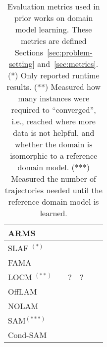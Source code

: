 \documentclass{article}
\newcommand{\cmark}{\ding{51}} %
\newcommand{\xmark}{\ding{55}} %
\newcommand{\smallcite}[1]{\begingroup\scriptsize\citep{#1}\endgroup}
\theoremstyle{definition}
\theoremstyle{remark}
\newcommand{\sam}{\ac{SAM}\xspace}
\begin{document}
\begin{table}[bt]
{\begin{tabular}{|p{3.7cm}|c|c|c|c|c|}
ARMS \smallcite{yang2007learning} & \cmark & \xmark & \xmark & \xmark & \xmark  \\
\hline
SLAF 
\smallcite{amir2008learning}$^{(*)}$& \xmark & \xmark & \xmark & \xmark & \xmark  \\
\hline
FAMA 
\smallcite{aineto2019learning} & \cmark & \cmark & \cmark & \xmark & \xmark  \\
\hline
LOCM \smallcite{cresswell2013acquiring}$^{(**)}$ & \xmark & ? & ? & \xmark & \xmark  \\
\hline
OffLAM \smallcite{LAMANNA2025104256} & \cmark & \xmark & \xmark & \cmark & \cmark  \\
\hline
NOLAM \smallcite{Lamanna24} & \cmark & \xmark & \xmark & \cmark & \cmark  \\
\hline
\sam \smallcite{juba2021safe}$^{(***)}$ & \cmark & \xmark & \xmark & \xmark & \xmark  \\
\hline
Cond-SAM \smallcite{mordoch2024safe} & \cmark & \xmark & \xmark & \cmark & \xmark  \\ %
\hline %
\end{tabular}
}
\caption{Evaluation metrics used in prior works on domain model learning. These metrics are defined Sections~\ref{sec:problem-setting} and~\ref{sec:metrics}. 
(*) Only reported runtime results. (**) Measured how many instances were required to ``converged'', i.e., reached where more data is not helpful, and whether the domain is isomorphic to a reference domain model. (***) Measured the number of trajectories needed until the reference domain model is learned.}
\label{tab:metric-using-comparison}
\end{table}

\end{document}
